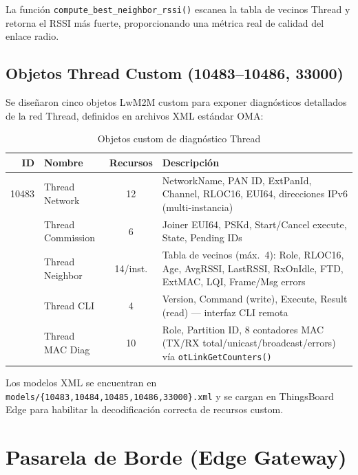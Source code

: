 \documentclass[11pt,a4paper]{article}
\begin{document}
\noindent La función \texttt{compute\_best\_neighbor\_rssi()} escanea la tabla de vecinos Thread y retorna el RSSI más fuerte, proporcionando una métrica real de calidad del enlace radio.

\subsection{Objetos Thread Custom (10483--10486, 33000)}

Se diseñaron cinco objetos LwM2M custom para exponer diagnósticos detallados de la red Thread, definidos en archivos XML estándar OMA:

\begin{table}[H]
\centering
\caption{Objetos custom de diagnóstico Thread}
\label{tab:thread-objects}
\begin{tabularx}{\textwidth}{r l c X}
\toprule
\textbf{ID} & \textbf{Nombre} & \textbf{Recursos} & \textbf{Descripción} \\
\midrule
10483 & Thread Network & 12 & NetworkName, PAN ID, ExtPanId, Channel, RLOC16, EUI64, direcciones IPv6 (multi-instancia) \\
\addlinespace
10484 & Thread Commission & 6 & Joiner EUI64, PSKd, Start/Cancel execute, State, Pending IDs \\
\addlinespace
10485 & Thread Neighbor & 14/inst. & Tabla de vecinos (máx.\ 4): Role, RLOC16, Age, AvgRSSI, LastRSSI, RxOnIdle, FTD, ExtMAC, LQI, Frame/Msg errors \\
\addlinespace
10486 & Thread CLI & 4 & Version, Command (write), Execute, Result (read) --- interfaz CLI remota \\
\addlinespace
33000 & Thread MAC Diag & 10 & Role, Partition ID, 8 contadores MAC (TX/RX total/unicast/broadcast/errors) vía \texttt{otLinkGetCounters()} \\
\bottomrule
\end{tabularx}
\end{table}

\noindent Los modelos XML se encuentran en \texttt{models/\{10483,10484,10485,10486,33000\}.xml} y se cargan en ThingsBoard Edge para habilitar la decodificación correcta de recursos custom.

\section{Pasarela de Borde (Edge Gateway)}
\end{document}
